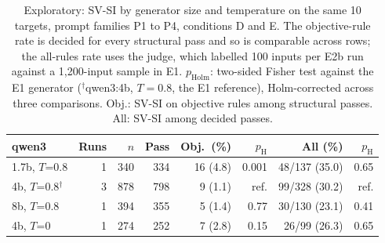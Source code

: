 \begin{table}[t]
\caption{Exploratory: SV-SI by generator size and temperature on the same 10 targets, prompt families
P1 to P4, conditions D and E. The objective-rule rate is decided for every structural pass and so is
comparable across rows; the all-rules rate uses the judge, which labelled 100 inputs per E2b run
against a 1{,}200-input sample in E1. $p_{\mathrm{Holm}}$: two-sided Fisher test against the E1
generator ($^{\dagger}$qwen3:4b, $T=0.8$, the E1 reference), Holm-corrected across three comparisons.
Obj.: SV-SI on objective rules among structural passes. All: SV-SI among decided passes.}
\label{tab:e2b}
\centering
\footnotesize
\setlength{\tabcolsep}{2.5pt}
\begin{tabular}{lrrrrrrr}
\toprule
qwen3 & Runs & $n$ & Pass & Obj.\ (\%) & $p_{\mathrm{H}}$ & All (\%) & $p_{\mathrm{H}}$ \\
\midrule
1.7b, $T$=0.8 & 1 & 340 & 334 & 16 (4.8) & 0.001 & 48/137 (35.0) & 0.65 \\
4b, $T$=0.8$^{\dagger}$ & 3 & 878 & 798 & 9 (1.1) & ref. & 99/328 (30.2) & ref. \\
8b, $T$=0.8 & 1 & 394 & 355 & 5 (1.4) & 0.77 & 30/130 (23.1) & 0.41 \\
4b, $T$=0 & 1 & 274 & 252 & 7 (2.8) & 0.15 & 26/99 (26.3) & 0.65 \\
\bottomrule
\end{tabular}
\end{table}
